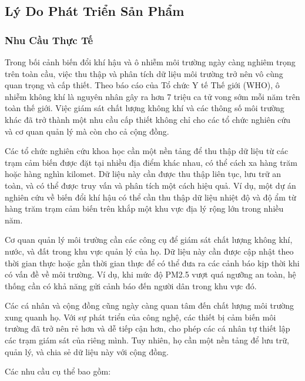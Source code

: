 \subsection{Lý Do Phát Triển Sản Phẩm}

\subsubsection{Nhu Cầu Thực Tế}

Trong bối cảnh biến đổi khí hậu và ô nhiễm môi trường ngày càng nghiêm trọng trên toàn cầu, việc thu thập và phân tích dữ liệu môi trường trở nên vô cùng quan trọng và cấp thiết. Theo báo cáo của Tổ chức Y tế Thế giới (WHO), ô nhiễm không khí là nguyên nhân gây ra hơn 7 triệu ca tử vong sớm mỗi năm trên toàn thế giới. Việc giám sát chất lượng không khí và các thông số môi trường khác đã trở thành một nhu cầu cấp thiết không chỉ cho các tổ chức nghiên cứu và cơ quan quản lý mà còn cho cả cộng đồng.

Các tổ chức nghiên cứu khoa học cần một nền tảng để thu thập dữ liệu từ các trạm cảm biến được đặt tại nhiều địa điểm khác nhau, có thể cách xa hàng trăm hoặc hàng nghìn kilomet. Dữ liệu này cần được thu thập liên tục, lưu trữ an toàn, và có thể được truy vấn và phân tích một cách hiệu quả. Ví dụ, một dự án nghiên cứu về biến đổi khí hậu có thể cần thu thập dữ liệu nhiệt độ và độ ẩm từ hàng trăm trạm cảm biến trên khắp một khu vực địa lý rộng lớn trong nhiều năm.

Cơ quan quản lý môi trường cần các công cụ để giám sát chất lượng không khí, nước, và đất trong khu vực quản lý của họ. Dữ liệu này cần được cập nhật theo thời gian thực hoặc gần thời gian thực để có thể đưa ra các cảnh báo kịp thời khi có vấn đề về môi trường. Ví dụ, khi mức độ PM2.5 vượt quá ngưỡng an toàn, hệ thống cần có khả năng gửi cảnh báo đến người dân trong khu vực đó.

Các cá nhân và cộng đồng cũng ngày càng quan tâm đến chất lượng môi trường xung quanh họ. Với sự phát triển của công nghệ, các thiết bị cảm biến môi trường đã trở nên rẻ hơn và dễ tiếp cận hơn, cho phép các cá nhân tự thiết lập các trạm giám sát của riêng mình. Tuy nhiên, họ cần một nền tảng để lưu trữ, quản lý, và chia sẻ dữ liệu này với cộng đồng.

Các nhu cầu cụ thể bao gồm:

